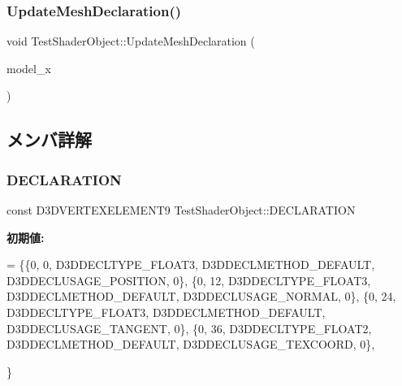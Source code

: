 \subsubsection{\texorpdfstring{Update\+Mesh\+Declaration()}{UpdateMeshDeclaration()}}
{\footnotesize\ttfamily void Test\+Shader\+Object\+::\+Update\+Mesh\+Declaration (\begin{DoxyParamCaption}\item[{\mbox{\hyperlink{class_model_x_object}{Model\+X\+Object}} $\ast$}]{model\+\_\+x }\end{DoxyParamCaption})\hspace{0.3cm}{\ttfamily [static]}}



\subsection{メンバ詳解}
\mbox{\label{class_test_shader_object_a1ed43afd7dd1b419fc038128ac31a122}} 
\subsubsection{\texorpdfstring{D\+E\+C\+L\+A\+R\+A\+T\+I\+ON}{DECLARATION}}
{\footnotesize\ttfamily const D3\+D\+V\+E\+R\+T\+E\+X\+E\+L\+E\+M\+E\+N\+T9 Test\+Shader\+Object\+::\+D\+E\+C\+L\+A\+R\+A\+T\+I\+ON\hspace{0.3cm}{\ttfamily [static]}}

{\bfseries 初期値\+:}
\begin{DoxyCode}
= \{\{0,  0, D3DDECLTYPE\_FLOAT3, D3DDECLMETHOD\_DEFAULT, D3DDECLUSAGE\_POSITION, 0\},
       \{0, 12, D3DDECLTYPE\_FLOAT3, D3DDECLMETHOD\_DEFAULT, D3DDECLUSAGE\_NORMAL,   0\},
       \{0, 24, D3DDECLTYPE\_FLOAT3, D3DDECLMETHOD\_DEFAULT, D3DDECLUSAGE\_TANGENT,  0\},
       \{0, 36, D3DDECLTYPE\_FLOAT2, D3DDECLMETHOD\_DEFAULT, D3DDECLUSAGE\_TEXCOORD, 0\},

      \}
\end{DoxyCode}
\mbox{\label{class_test_shader_object_a12ffb8becf8fc3152346435a243ae072}} 
